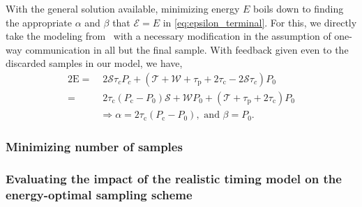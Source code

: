 With the general solution available, minimizing energy $E$ boils down to finding the appropriate $\alpha$ and $\beta$ that $\mathcal{E}=E$ in \cref{eq:epsilon_terminal}.
For this, we directly take the modeling from~\cite{secAperiodic} with a necessary modification in the assumption of one-way communication in all but the final sample.
With feedback given even to the discarded samples in our model, we have, 
\begin{alignat}{2}
    \mathrm{E}=&\;2\mathcal{S}\tau_cP_c+(\mathcal{T}+\mathcal{W}+\tau_\mathrm{p}+2\tau_\mathrm{c}-2\mathcal{S}\tau_c)P_0\nonumber\\
    =&\;2\tau_{\text{c}}(P_{\text{c}} -P_0)\mathcal{S}+\mathcal{W}P_0+(\mathcal{T}+\tau_{\text{p}} +2\tau_{\text{c}}) P_0\nonumber\\
&\Rightarrow \alpha=2\tau_{\text{c}}(P_{\text{c}} -P_0),\text{ and }\beta=P_0.\nonumber
\end{alignat}


\subsubsection{Minimizing number of samples }\label{sec:aprxSol_Energy_samples}


\subsubsection{Evaluating the impact of the realistic timing model on the energy-optimal sampling scheme}

